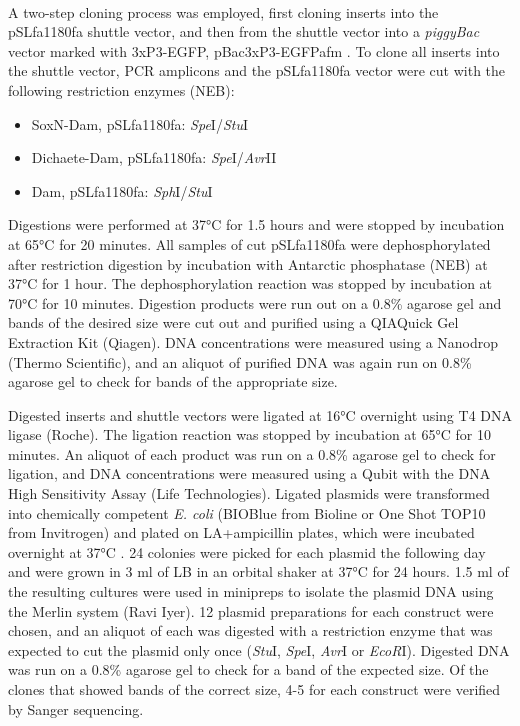 \paragraph{}
A two-step cloning process was employed, first cloning inserts into the pSLfa1180fa shuttle vector, and then from the shuttle vector into a \emph{piggyBac} vector marked with 3xP3-EGFP, pBac{3xP3-EGFPafm} \citep{horn_versatile_2000}. To clone all inserts into the shuttle vector, PCR amplicons and the pSLfa1180fa vector were cut with the following restriction enzymes (NEB):
\begin{itemize}
	\item SoxN-Dam, pSLfa1180fa: \emph{Spe}I/\emph{Stu}I
	\item Dichaete-Dam, pSLfa1180fa: \emph{Spe}I/\emph{Avr}II
	\item Dam, pSLfa1180fa: \emph{Sph}I/\emph{Stu}I
\end{itemize}
Digestions were performed at 37°C for 1.5 hours and were stopped by incubation at 65°C for 20 minutes. All samples of cut pSLfa1180fa were dephosphorylated after restriction digestion by incubation with Antarctic phosphatase (NEB) at 37°C for 1 hour. The dephosphorylation reaction was stopped by incubation at 70°C for 10 minutes. Digestion products were run out on a 0.8\% agarose gel and bands of the desired size were cut out and purified using a QIAQuick Gel Extraction Kit (Qiagen). DNA concentrations were measured using a Nanodrop (Thermo Scientific), and an aliquot of purified DNA was again run on 0.8\% agarose gel to check for bands of the appropriate size.
  
Digested inserts and shuttle vectors were ligated at 16°C overnight using T4 DNA ligase (Roche). The ligation reaction was stopped by incubation at 65°C for 10 minutes. An aliquot of each product was run on a 0.8\% agarose gel to check for ligation, and DNA concentrations were measured using a Qubit with the DNA High Sensitivity Assay (Life Technologies). Ligated plasmids were transformed into chemically competent \emph{E. coli} (BIOBlue from Bioline or One Shot TOP10 from Invitrogen) and plated on LA+ampicillin plates, which were incubated overnight at 37°C . 24 colonies were picked for each plasmid the following day and were grown in 3 ml of LB in an orbital shaker at 37°C for 24 hours. 1.5 ml of the resulting cultures were used in minipreps to isolate the plasmid DNA using the Merlin system (Ravi Iyer). 12 plasmid preparations for each construct were chosen, and an aliquot of each was digested with a restriction enzyme that was expected to cut the plasmid only once (\emph{Stu}I, \emph{Spe}I, \emph{Avr}I or \emph{EcoR}I). Digested DNA was run on a 0.8\% agarose gel to check for a band of the expected size. Of the clones that showed bands of the correct size, 4-5 for each construct were verified by Sanger sequencing.
